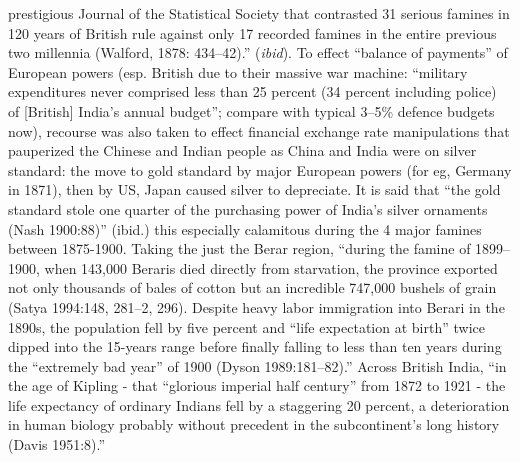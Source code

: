 prestigious Journal of the Statistical Society that contrasted 31 serious famines in 120 years of British rule against only 17 recorded famines in the entire previous two millennia (Walford, 1878: 434–42).” ({\sl ibid}). To effect “balance of payments” of European powers (esp. British due to their massive war machine: “military expenditures never comprised less than 25 percent (34 percent including police) of [British] India’s annual budget”; compare with typical 3--5\% defence budgets now), recourse was also taken to effect financial exchange rate manipulations that pauperized the Chinese and Indian people as China and India were on silver standard: the move to gold standard by major European powers (for eg, Germany in 1871), then by US, Japan caused silver to depreciate. It is said that “the gold standard stole one quarter of the purchasing power of India’s silver ornaments (Nash 1900:88)” (ibid.) this especially calamitous during the 4 major famines between 1875-1900. Taking the just the Berar region, “during the famine of 1899–1900, when 143,000 Beraris died directly from starvation, the province exported not only thousands of bales of cotton but an incredible 747,000 bushels of grain (Satya 1994:148, 281–2, 296). Despite heavy labor immigration into Berari in the 1890s, the population fell by five percent and “life expectation at birth” twice dipped into the 15-years range before finally falling to less than ten years during the “extremely bad year” of 1900 (Dyson 1989:181–82).” Across British India, “in the age of Kipling - that “glorious imperial half century” from 1872 to 1921 - the life expectancy of ordinary Indians fell by a staggering 20 percent, a deterioration in human biology probably without precedent in the subcontinent’s long history (Davis 1951:8).” 

